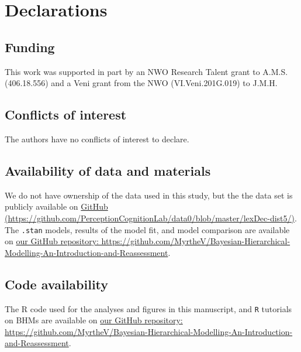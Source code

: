 \documentclass[
  english,
  doc,floatsintext]{apa6}
\begin{document}
\newpage

\hypertarget{declarations}{%
\section{Declarations}\label{declarations}}

\hypertarget{funding}{%
\subsection{Funding}\label{funding}}

This work was supported in part by an NWO Research Talent grant to A.M.S. (406.18.556) and a Veni grant from the NWO (VI.Veni.201G.019) to J.M.H.

\hypertarget{conflicts-of-interest}{%
\subsection{Conflicts of interest}\label{conflicts-of-interest}}

The authors have no conflicts of interest to declare.

\hypertarget{availability-of-data-and-materials}{%
\subsection{Availability of data and materials}\label{availability-of-data-and-materials}}

We do not have ownership of the data used in this study, but the the data set is publicly available on \href{https://github.com/PerceptionCognitionLab/data0/blob/master/lexDec-dist5/}{GitHub (https://github.com/PerceptionCognitionLab/data0/blob/master/lexDec-dist5/)}. The \texttt{.stan} models, results of the model fit, and model comparison are available on \href{https://github.com/MyrtheV/Bayesian-Hierarchical-Modelling-An-Introduction-and-Reassessment}{our GitHub repository: https://github.com/MyrtheV/Bayesian-Hierarchical-Modelling-An-Introduction-and-Reassessment}.

\hypertarget{code-availability}{%
\subsection{Code availability}\label{code-availability}}

The R code used for the analyses and figures in this manuscript, and \texttt{R} tutorials on BHMs are available on \href{https://github.com/MyrtheV/Bayesian-Hierarchical-Modelling-An-Introduction-and-Reassessment}{our GitHub repository: https://github.com/MyrtheV/Bayesian-Hierarchical-Modelling-An-Introduction-and-Reassessment}.
\end{document}
